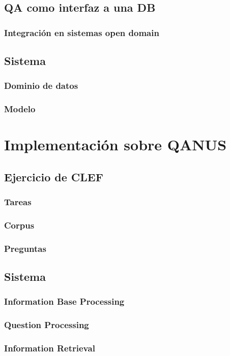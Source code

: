 \section{QA como interfaz a una DB}
\subsection{Integración en sistemas open domain}
\section{Sistema}
\subsection{Dominio de datos}
\subsection{Modelo}
\chapter{Implementación sobre QANUS}
\section{Ejercicio de CLEF}
\subsection{Tareas}
\subsection{Corpus}
\subsection{Preguntas}
\section{Sistema}

\subsection{Information Base Processing}
\subsection{Question Processing}
\subsection{Information Retrieval}
